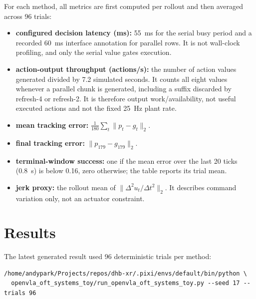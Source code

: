\documentclass[11pt]{article}
\begin{document}
For each method, all metrics are first computed per rollout and then averaged across 96 trials:
\begin{itemize}[leftmargin=1.5em]
  \item \textbf{configured decision latency (ms):} 55~ms for the serial busy period and a recorded 60~ms interface annotation for parallel rows. It is not wall-clock profiling, and only the serial value gates execution.
  \item \textbf{action-output throughput (actions/s):} the number of action values generated divided by 7.2 simulated seconds. It counts all eight values whenever a parallel chunk is generated, including a suffix discarded by refresh-4 or refresh-2. It is therefore output work/availability, not useful executed actions and not the fixed 25~Hz plant rate.
  \item \textbf{mean tracking error:} \(\frac{1}{180}\sum_t\lVert p_t-g_t\rVert_2\).
  \item \textbf{final tracking error:} \(\lVert p_{179}-g_{179}\rVert_2\).
  \item \textbf{terminal-window success:} one if the mean error over the last 20 ticks (0.8~s) is below 0.16, zero otherwise; the table reports its trial mean.
  \item \textbf{jerk proxy:} the rollout mean of \(\lVert\Delta^2u_t/\Delta t^2\rVert_2\). It describes command variation only, not an actuator constraint.
\end{itemize}

\section{Results}

The latest generated result used 96 deterministic trials per method:
\begin{verbatim}
/home/andypark/Projects/repos/dhb-xr/.pixi/envs/default/bin/python \
  openvla_oft_systems_toy/run_openvla_oft_systems_toy.py --seed 17 --trials 96
\end{verbatim}
\end{document}
